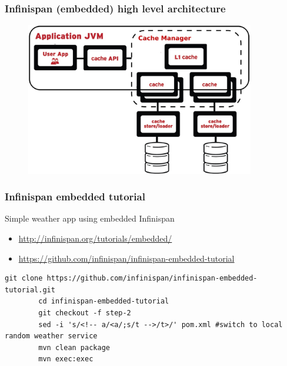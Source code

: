 \documentclass[10pt,utf8]{beamer}
\begin{document}
\begin{frame}
	\frametitle{Infinispan (embedded) high level architecture}
	\begin{figure}
		\centering
		\includegraphics[width=10cm]{./img/ispn_high_level_emb.eps}
	\end{figure}
\end{frame}

\begin{frame}[fragile]
	\frametitle{Infinispan embedded tutorial}
	Simple weather app using embedded Infinispan
	\begin{itemize}
		\item \small{\url{http://infinispan.org/tutorials/embedded/}}
		\item \small{\url{https://github.com/infinispan/infinispan-embedded-tutorial}}
	\end{itemize}
	\vspace{0.3cm}
	\begin{lstlisting}[style=Bash]
		git clone https://github.com/infinispan/infinispan-embedded-tutorial.git
		cd infinispan-embedded-tutorial
		git checkout -f step-2
		sed -i 's/<!-- a/<a/;s/t -->/t>/' pom.xml #switch to local random weather service
		mvn clean package
		mvn exec:exec
	\end{lstlisting}
\end{frame}
\end{document}
